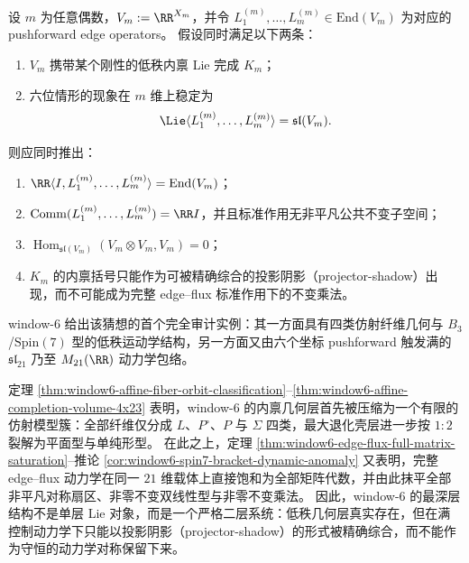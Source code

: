 \begin{conjecture}[动态--运动学二层刚性]\label{conj:window-even-dynamic-kinematic-two-layer-rigidity}
设 \(m\) 为任意偶数，\(V_m:=\RR^{X_m}\)，并令 \(L_1^{(m)},\dots,L_m^{(m)}\in \mathrm{End}(V_m)\) 为对应的 pushforward edge operators。
假设同时满足以下两条：
\begin{enumerate}
  \item \(V_m\) 携带某个刚性的低秩内禀 Lie 完成 \(K_m\)；
  \item 六位情形的现象在 \(m\) 维上稳定为
  \[
  \Lie\langle L_1^{(m)},\dots,L_m^{(m)}\rangle=\mathfrak{sl}(V_m).
  \]
\end{enumerate}
则应同时推出：
\begin{enumerate}
  \item \(\RR\langle I,L_1^{(m)},\dots,L_m^{(m)}\rangle=\mathrm{End}(V_m)\)；
  \item \(\operatorname{Comm}(L_1^{(m)},\dots,L_m^{(m)})=\RR I\)，并且标准作用无非平凡公共不变子空间；
  \item \(\operatorname{Hom}_{\mathfrak{sl}(V_m)}(V_m\otimes V_m,V_m)=0\)；
  \item \(K_m\) 的内禀括号只能作为可被精确综合的投影阴影（projector-shadow）出现，而不可能成为完整 edge--flux 标准作用下的不变乘法。
\end{enumerate}
window-\(6\) 给出该猜想的首个完全审计实例：其一方面具有四类仿射纤维几何与 \(B_3\)/\(\mathrm{Spin}(7)\) 型的低秩运动学结构，另一方面又由六个坐标 pushforward 触发满的 \(\mathfrak{sl}_{21}\) 乃至 \(M_{21}(\RR)\) 动力学包络。
\end{conjecture}

\begin{remark}\label{rem:window6-affine-dynamics-two-layer-structure}
定理 \ref{thm:window6-affine-fiber-orbit-classification}--\ref{thm:window6-affine-completion-volume-4x23} 表明，window-\(6\) 的内禀几何层首先被压缩为一个有限的仿射模型簇：全部纤维仅分成 \(L\)、\(P^\circ\)、\(P\) 与 \(\Sigma\) 四类，最大退化壳层进一步按 \(1:2\) 裂解为平面型与单纯形型。
在此之上，定理 \ref{thm:window6-edge-flux-full-matrix-saturation}--推论 \ref{cor:window6-spin7-bracket-dynamic-anomaly} 又表明，完整 edge--flux 动力学在同一 \(21\) 维载体上直接饱和为全部矩阵代数，并由此抹平全部非平凡对称扇区、非零不变双线性型与非零不变乘法。
因此，window-\(6\) 的最深层结构不是单层 Lie 对象，而是一个严格二层系统：低秩几何层真实存在，但在满控制动力学下只能以投影阴影（projector-shadow）的形式被精确综合，而不能作为守恒的动力学对称保留下来。
\end{remark}

\endinput
